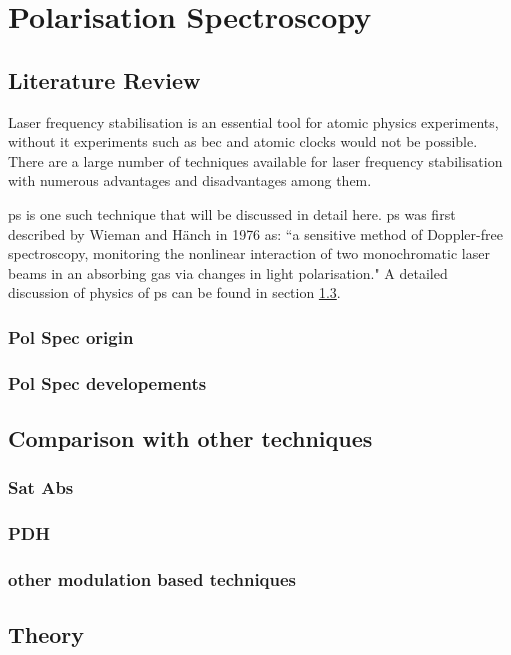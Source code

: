 \chapter{Polarisation Spectroscopy}
\setcounter{page}{1}

\section{Literature Review}

Laser frequency stabilisation is an essential tool for atomic physics experiments, without it experiments such as \gls{bec} and atomic clocks would not be possible.
There are a large number of techniques available for laser frequency stabilisation with numerous advantages and disadvantages among them.

\Gls{ps} is one such technique that will be discussed in detail here.
\Gls{ps} was first described by Wieman and H\"anch in 1976 as: ``a sensitive method of Doppler-free spectroscopy, monitoring the nonlinear interaction of two monochromatic laser beams in an absorbing gas via changes in light polarisation."\cite{wieman_doppler-free_1976}
A detailed discussion of physics of \gls{ps} can be found in section \ref{section:pol_spec_theory}.

\subsection{Pol Spec origin}
\subsection{Pol Spec developements}
\section{Comparison with other techniques}
\subsection{Sat Abs}
\subsection{PDH}
\subsection{other modulation based techniques}
\section{Theory}\label{section:pol_spec_theory}
